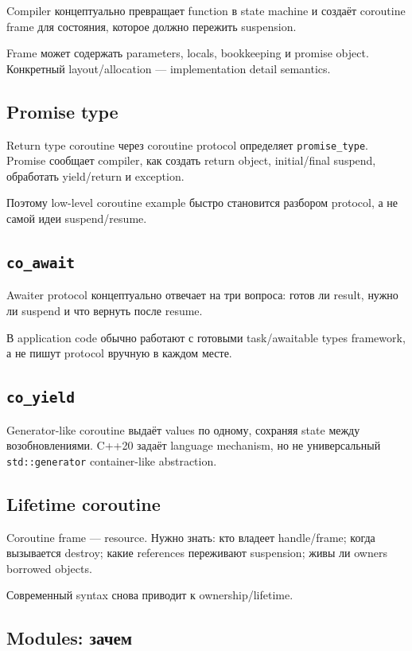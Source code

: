 Compiler концептуально превращает function в state machine и создаёт coroutine
frame для состояния, которое должно пережить suspension.

Frame может содержать parameters, locals, bookkeeping и promise object.
Конкретный layout/allocation --- implementation detail semantics.

\subsection{Promise type}

Return type coroutine через coroutine protocol определяет
\texttt{promise\_type}. Promise сообщает compiler, как создать return object,
initial/final suspend, обработать yield/return и exception.

Поэтому low-level coroutine example быстро становится разбором protocol, а не
самой идеи suspend/resume.

\subsection{\texttt{co\_await}}

Awaiter protocol концептуально отвечает на три вопроса:
готов ли result, нужно ли suspend и что вернуть после resume.

В application code обычно работают с готовыми task/awaitable types framework,
а не пишут protocol вручную в каждом месте.

\subsection{\texttt{co\_yield}}

Generator-like coroutine выдаёт values по одному, сохраняя state между
возобновлениями. C++20 задаёт language mechanism, но не универсальный
\texttt{std::generator} container-like abstraction.

\subsection{Lifetime coroutine}

Coroutine frame --- resource. Нужно знать:
кто владеет handle/frame; когда вызывается destroy; какие references переживают suspension; живы ли owners borrowed objects.

Современный syntax снова приводит к ownership/lifetime.

\subsection{Modules: зачем}

